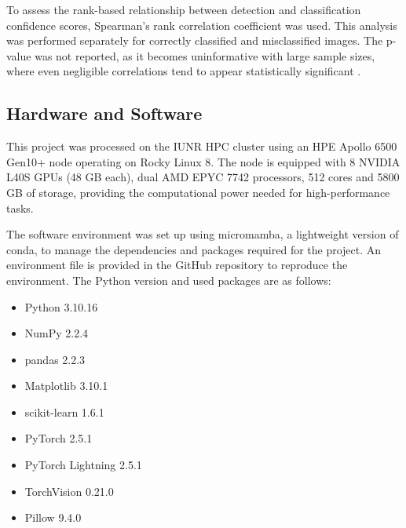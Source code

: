     To assess the rank-based relationship between detection and classification confidence scores, Spearman's rank correlation coefficient was used.
    This analysis was performed separately for correctly classified and misclassified images.
    The p-value was not reported, as it becomes uninformative with large sample sizes, where even negligible correlations tend to appear statistically significant \autocite{linResearchCommentaryToo2013}.

    \subsection{Hardware and Software}
    This project was processed on the \ac{IUNR} \ac{HPC} cluster using an HPE Apollo 6500 Gen10+ node operating on Rocky Linux 8.
    The node is equipped with 8 NVIDIA L40S \acp{GPU} (48 \ac{GB} each), dual AMD EPYC 7742 processors, 512 cores and 5800 \ac{GB} of storage, providing the computational power needed for high-performance tasks.

    The software environment was set up using micromamba, a lightweight version of conda, to manage the dependencies and packages required for the project.
    An environment file is provided in the GitHub repository to reproduce the environment.
    The Python version and used packages are as follows:

    \begin{itemize}
        \item Python 3.10.16
        \item NumPy 2.2.4
        \item pandas 2.2.3
        \item Matplotlib 3.10.1
        \item scikit-learn 1.6.1
        \item PyTorch 2.5.1
        \item PyTorch Lightning 2.5.1
        \item TorchVision 0.21.0
        \item Pillow 9.4.0
    \end{itemize}
